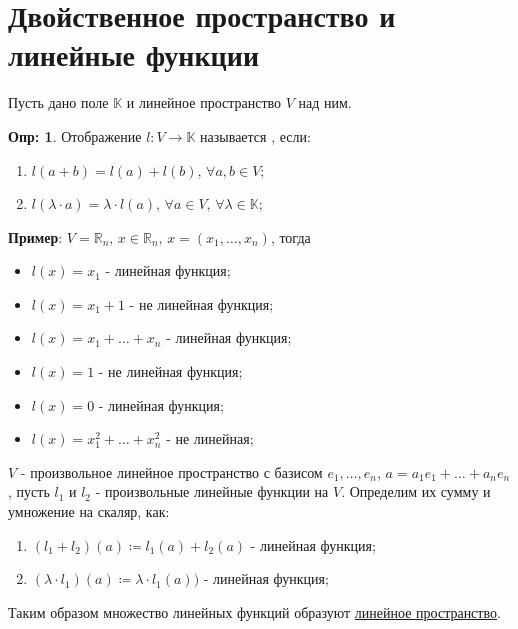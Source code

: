 \documentclass[12pt]{article}
\newcommand{\MR}{\mathbb{R}}
\theoremstyle{definition}
\newtheorem{defn}{Опр:}
\begin{document}
\newpage
\section*{Двойственное пространство и линейные функции}
Пусть дано поле $\mathbb{K}$ и линейное пространство $V$ над ним.
\begin{defn}
	Отображение $l \colon V \to \mathbb{K}$ называется , если:
	\begin{enumerate}[label ={(\arabic*)}]
		\item $l(a+b) = l(a) + l(b), \, \forall a,b \in V$;
		\item $l(\lambda {\cdot} a) = \lambda {\cdot} l(a),\, \forall a \in V, \, \forall \lambda \in \mathbb{K}$;
	\end{enumerate}
\end{defn}

\textbf{Пример}: $V = \MR_n, \, x \in \MR_n, \, x = (x_1,\dotsc, x_n)$, тогда
\begin{itemize}
	\item $l(x) = x_1$ - линейная функция;
	\item $l(x) = x_1 + 1$ - не линейная функция;
	\item $l(x) = x_1 + \dotsc + x_n$ - линейная функция;
	\item $l(x) = 1$ - не линейная функция;
	\item $l(x) = 0$ - линейная функция;
	\item $l(x) = x_1^2 + \dotsc + x_n^2$ - не линейная;
\end{itemize}

$V$ - произвольное линейное пространство с базисом $e_1, \dotsc, e_n$, $a = a_1 e_1 + \dotsc + a_n e_n$, пусть $l_1$ и $l_2$ - произвольные линейные функции на $V$. Определим их сумму и умножение на скаляр, как:
\begin{enumerate}[label ={(\arabic*)}]
	\item $(l_1 + l_2)(a) \coloneqq l_1(a) + l_2(a)$ - линейная функция;
	\item $(\lambda {\cdot} l_1)(a) \coloneqq \lambda {\cdot} l_1(a))$ - линейная функция;
\end{enumerate}
Таким образом множество линейных функций образуют \uline{линейное пространство}.
\end{document}
